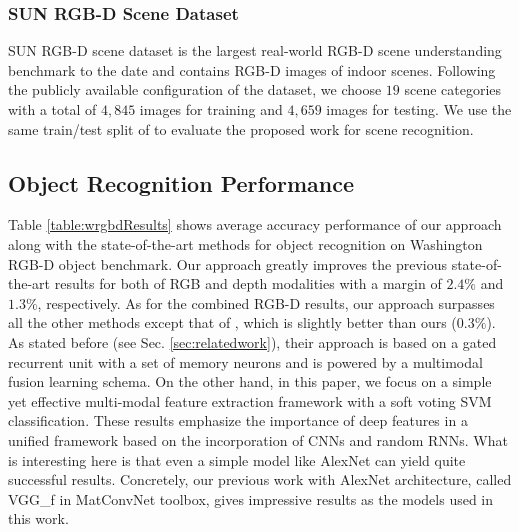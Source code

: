 \subsubsection{SUN RGB-D Scene Dataset}
SUN RGB-D scene dataset is the largest real-world RGB-D scene understanding benchmark to the date and  contains RGB-D images of indoor scenes. Following the publicly available configuration of the dataset, we choose $19$ scene categories with a total of $4,845$ images for training and $4,659$ images for testing. We use the same train/test split of \cite{Song_CVPR_2015} to evaluate the proposed work for scene recognition.

\subsection{Object Recognition Performance} \label{sec:exp.objectRecognition}
Table \ref{table:wrgbdResults} shows average accuracy performance of our approach along with the state-of-the-art methods for object recognition on Washington RGB-D object benchmark. Our approach greatly improves the previous state-of-the-art results for both of RGB and depth modalities with a margin of $2.4\%$ and $1.3\%$, respectively. As for the combined RGB-D results, our approach surpasses all the other methods except that of \cite{Loghmani_RAL_2019}, which is slightly better than ours ($0.3\%$). As stated before (see Sec. \ref{sec:relatedwork}), their approach is based on a gated recurrent unit with a set of memory neurons and is powered by a multimodal fusion learning schema. On the other hand, in this paper, we focus on a simple yet effective multi-modal feature extraction framework with a soft voting SVM classification. These results emphasize the importance of deep features in a unified framework based on the incorporation of CNNs and random RNNs. What is interesting here is that even a simple model like AlexNet can yield quite successful results. Concretely, our previous work \citep{Caglayan_ECCVW_2018} with AlexNet architecture, called VGG\_f in MatConvNet toolbox, gives impressive results as the models used in this work.
